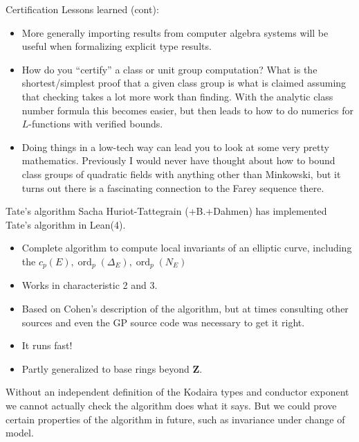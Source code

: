 \documentclass{beamer}
\theoremstyle{plain}
\newcommand{\ZZ}{\mathbf{Z}}
\DeclareMathOperator{\ord}{ord}
\begin{document}
\begin{frame}{Certification}
    Lessons learned (cont):
    \begin{itemize}
        \item
            More generally importing results from computer algebra systems will be useful when formalizing explicit type results.\pause
        \item
    How do you ``certify'' a class or unit group computation? What is the shortest/simplest proof that a given 
    class group is what is claimed assuming that checking takes a lot more work than finding. With the analytic class number formula this becomes easier, but then leads to how to do numerics for $L$-functions with verified bounds.\pause

        \item
    Doing things in a low-tech way can lead you to look at some very pretty mathematics.
    Previously I would never have thought about how to bound class groups of quadratic fields with anything other than Minkowski, but it turns out there is a fascinating connection to the Farey sequence there.
    \end{itemize}
\end{frame}

\begin{frame}{Tate's algorithm}
    Sacha Huriot-Tattegrain (+B.+Dahmen) has implemented Tate's algorithm in Lean(4).

    \begin{itemize}
        \item Complete algorithm to compute local invariants of an elliptic curve, including the $c_p(E), \ord_p(\Delta_E), \ord_p(N_E)$

        \item Works in characteristic 2 and 3.

        \item Based on Cohen's description of the algorithm, but at times consulting other sources and even the GP source code was necessary to get it right.

        \item It runs fast!

        \item Partly generalized to base rings beyond $\ZZ$.
    \end{itemize}

    Without an independent definition of the Kodaira types and conductor exponent we cannot actually check the algorithm does what it says.
    But we could prove certain properties of the algorithm in future, such as invariance under change of model.
\end{frame}
\end{document}
